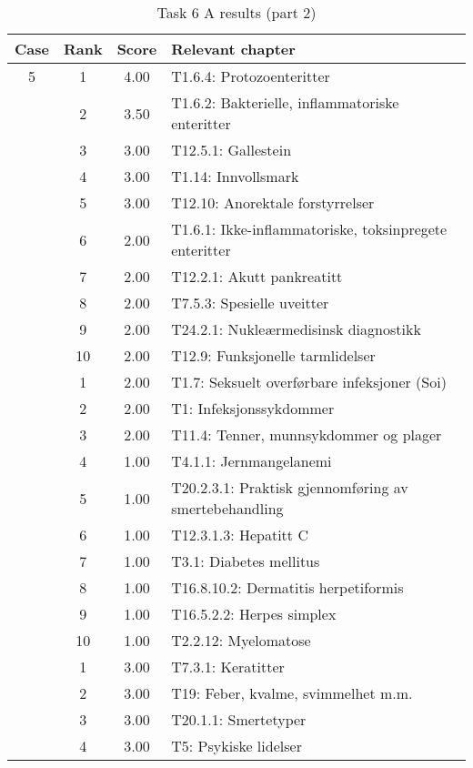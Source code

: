 \begin{table}[htbp] \footnotesize \center
\caption{Task 6 A results (part 2)\label{tab:task6a2}}
\begin{tabular}{c c c l}
    \toprule
    Case & Rank & Score & Relevant chapter \\
    \midrule
    5 & 1 & 4.00 & T1.6.4: Protozoenteritter \\
     & 2 & 3.50 & T1.6.2: Bakterielle, inflammatoriske enteritter \\
     & 3 & 3.00 & T12.5.1: Gallestein \\
     & 4 & 3.00 & T1.14: Innvollsmark \\
     & 5 & 3.00 & T12.10: Anorektale forstyrrelser \\
     & 6 & 2.00 & T1.6.1: Ikke-inflammatoriske, toksinpregete enteritter \\
     & 7 & 2.00 & T12.2.1: Akutt pankreatitt \\
     & 8 & 2.00 & T7.5.3: Spesielle uveitter \\
     & 9 & 2.00 & T24.2.1: Nukleærmedisinsk diagnostikk \\
     & 10 & 2.00 & T12.9: Funksjonelle tarmlidelser \\
	\addlinespace
    6 & 1 & 2.00 & T1.7: Seksuelt overførbare infeksjoner (Soi) \\
     & 2 & 2.00 & T1: Infeksjonssykdommer \\
     & 3 & 2.00 & T11.4: Tenner, munnsykdommer og plager \\
     & 4 & 1.00 & T4.1.1: Jernmangelanemi \\
     & 5 & 1.00 & T20.2.3.1: Praktisk gjennomføring av smertebehandling \\%
     & 6 & 1.00 & T12.3.1.3: Hepatitt C \\
     & 7 & 1.00 & T3.1: Diabetes mellitus \\
     & 8 & 1.00 & T16.8.10.2: Dermatitis herpetiformis \\
     & 9 & 1.00 & T16.5.2.2: Herpes simplex \\
     & 10 & 1.00 & T2.2.12: Myelomatose \\
	\addlinespace
    7 & 1 & 3.00 & T7.3.1: Keratitter \\
     & 2 & 3.00 & T19: Feber, kvalme, svimmelhet m.m. \\
     & 3 & 3.00 & T20.1.1: Smertetyper \\
     & 4 & 3.00 & T5: Psykiske lidelser \\

\end{tabular}
\end{table}
